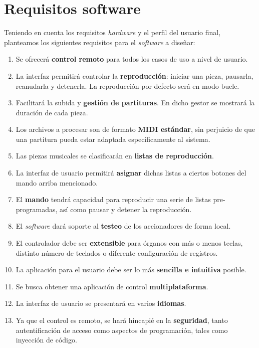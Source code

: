 \section{Requisitos software}

Teniendo en cuenta los requisitos \textit{hardware} y el perfil del usuario final, planteamos los siguientes requisitos para el \textit{software} a diseñar:

\begin{enumerate}

	\item Se ofrecerá \textbf{control remoto} para todos los casos de uso a nivel de usuario.
	
	\item La interfaz permitirá controlar la \textbf{reproducción}: iniciar una pieza, pausarla, reanudarla y detenerla. La reproducción por defecto será en modo bucle.
	
	\item Facilitará la subida y \textbf{gestión de partituras}. En dicho gestor se mostrará la duración de cada pieza.
	
	\item Los archivos a procesar son de formato \textbf{\acrshort{MIDI} estándar}, sin perjuicio de que una partitura pueda estar adaptada específicamente al sistema.
	
	\item Las piezas musicales se clasificarán en \textbf{listas de reproducción}.
	
	\item La interfaz de usuario permitirá \textbf{asignar} dichas listas a ciertos botones del mando arriba mencionado.
	
	\item El \textbf{mando} tendrá capacidad para reproducir una serie de listas pre-programadas, así como pausar y detener la reproducción.
	
	\item El \textit{software} dará soporte al \textbf{testeo} de los accionadores de forma local.
	
	\item El controlador debe ser \textbf{extensible} para órganos con más o menos teclas, distinto número de teclados o diferente configuración de registros.
	
	\item La aplicación para el usuario debe ser lo más \textbf{sencilla e intuitiva} posible.
	
	\item Se busca obtener una aplicación de control \textbf{multiplataforma}.
	
	\item La interfaz de usuario se presentará en varios \textbf{idiomas}.
	
	\item Ya que el control es remoto, se hará hincapié en la \textbf{seguridad}, tanto autentificación de acceso como aspectos de programación, tales como inyección de código.

\end{enumerate}

